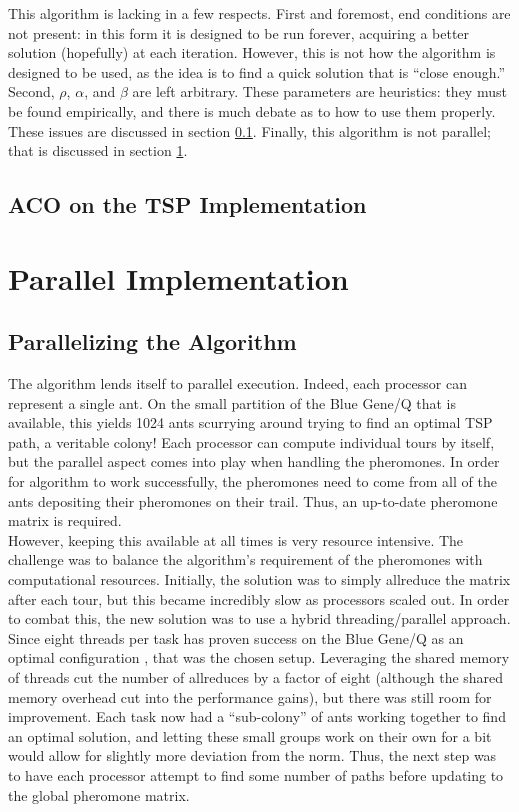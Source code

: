 \documentclass[twocolumn]{article}
\begin{document}
This algorithm is lacking in a few respects. First and foremost, end conditions are not present:
in this form it is designed to be run forever, acquiring a better solution (hopefully) at each
iteration. However, this is not how the algorithm is designed to be used, as the idea is to find
a quick solution that is ``close enough.'' Second, $\rho$, $\alpha$, and $\beta$ are left 
arbitrary. These parameters are heuristics: they must be found empirically, and there is much 
debate as to how to use them properly. These issues are discussed in section \ref{sub:acoimpl}.
Finally, this algorithm is not parallel; that is discussed in section \ref{sec:parallel}. 

\subsection{ACO on the TSP Implementation} \label{sub:acoimpl}



\section{Parallel Implementation} \label{sec:parallel}

\subsection{Parallelizing the Algorithm}

The algorithm lends itself to parallel execution. Indeed, each processor can
represent a single ant. On the small partition of the Blue Gene/Q that is
available, this yields 1024 ants scurrying around trying to find an optimal
TSP path, a veritable colony! Each processor can compute individual tours by
itself, but the parallel aspect comes into play when handling the pheromones.
In order for algorithm to work successfully, the pheromones need to come from 
all of the ants depositing their pheromones on their trail. Thus, an up-to-date
pheromone matrix is required. \\

However, keeping this available at all times is
very resource intensive. The challenge was to balance the algorithm's requirement
of the pheromones with computational resources. Initially, the solution was to
simply allreduce the matrix after each tour, but this became incredibly 
slow as processors scaled out. In order to combat this, the new solution was
to use a hybrid threading/parallel approach. Since eight threads per task has 
proven success on the Blue Gene/Q as an optimal configuration \cite{lolours},
that was the chosen setup. Leveraging the shared memory of threads cut the 
number of allreduces by a factor of eight (although the shared memory overhead
cut into the performance gains), but there was still room for improvement. Each
task now had a ``sub-colony'' of ants working together to find an optimal 
solution, and letting these small groups work on their own for a bit would allow
for slightly more deviation from the norm. Thus, the next step was to have 
each processor attempt to find some number of paths before updating to the global 
pheromone matrix. 
\end{document}
